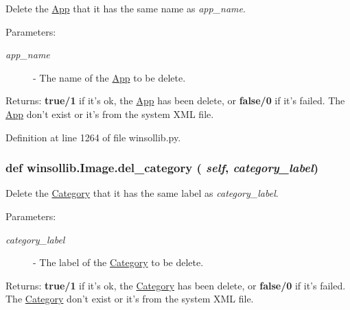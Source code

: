 Delete the \hyperlink{classwinsollib_1_1App}{App} that it has the same name as {\em app\_\-name\/}. 

\begin{Desc}
\item[Parameters:]
\begin{description}
\item[{\em app\_\-name}]- The name of the \hyperlink{classwinsollib_1_1App}{App} to be delete. \end{description}
\end{Desc}
\begin{Desc}
\item[Returns:]{\bf true/1} if it's ok, the \hyperlink{classwinsollib_1_1App}{App} has been delete, or {\bf false/0} if it's failed. The \hyperlink{classwinsollib_1_1App}{App} don't exist or it's from the system XML file. \end{Desc}


Definition at line 1264 of file winsollib.py.\hypertarget{classwinsollib_1_1Image_e871e8b3446fcbcb70a768c13da40337}{
\subsubsection[del\_\-category]{\setlength{\rightskip}{0pt plus 5cm}def winsollib.Image.del\_\-category ( {\em self},  {\em category\_\-label})}}
\label{classwinsollib_1_1Image_e871e8b3446fcbcb70a768c13da40337}


Delete the \hyperlink{classwinsollib_1_1Category}{Category} that it has the same label as {\em category\_\-label\/}. 

\begin{Desc}
\item[Parameters:]
\begin{description}
\item[{\em category\_\-label}]- The label of the \hyperlink{classwinsollib_1_1Category}{Category} to be delete. \end{description}
\end{Desc}
\begin{Desc}
\item[Returns:]{\bf true/1} if it's ok, the \hyperlink{classwinsollib_1_1Category}{Category} has been delete, or {\bf false/0} if it's failed. The \hyperlink{classwinsollib_1_1Category}{Category} don't exist or it's from the system XML file. \end{Desc}


